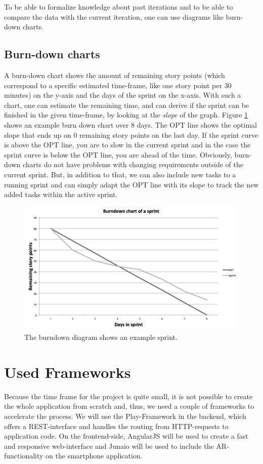 To be able to formalize knowledge about past iterations and to be able to compare the data with the current iteration, one can use diagrams like burn-down charts.

\subsection{Burn-down charts}
A burn-down chart shows the amount of remaining story points (which correspond to a specific estimated time-frame, like one story point per 30 minutes) on the y-axis and the days of the sprint on the x-axis. With such a chart, one can estimate the remaining time, and can derive if the sprint can be finished in the given time-frame, by looking at the \textit{slope} of the graph. Figure \ref{Burndown example} shows an example burn down chart over 8 days. The OPT line shows the optimal slope that ends up on 0 remaining story points on the last day. If the sprint curve is above the OPT line, you are to slow in the current sprint and in the case the sprint curve is below the OPT line, you are ahead of the time. Obviously, burn-down charts do not have problems with changing requirements outside of the current sprint. But, in addition to that, we can also include new tasks to a running sprint and can simply adapt the OPT line with its slope to track the new added tasks within the active sprint. 

\begin{figure}[th]
\centerline{\includegraphics[width=1\textwidth]{gfx/burndown}}
\caption{The burndown diagram shows an example sprint.}
\label{Burndown example}
\end{figure}

\section{Used Frameworks}
Because the time frame for the project is quite small, it is not possible to create the whole application from scratch and, thus, we need a couple of frameworks to accelerate the process. We will use the Play-Framework in the backend, which offers a \ac{REST}-interface and handles the routing from \ac{HTTP}-requests to application code. On the frontend-side, AngularJS will be used to create a fast and responsive web-interface and Junaio will be used to include the \ac{AR}-functionality on the smartphone application.

